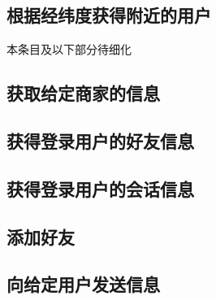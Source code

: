 \documentclass[cs4size]{ctexartutf8}
\begin{document}
\subsection{根据经纬度获得附近的用户}
本条目及以下部分待细化

\subsection{获取给定商家的信息}


\subsection{获得登录用户的好友信息}

\subsection{获得登录用户的会话信息}

\subsection{添加好友}

\subsection{向给定用户发送信息}




\newpage
\end{document}
